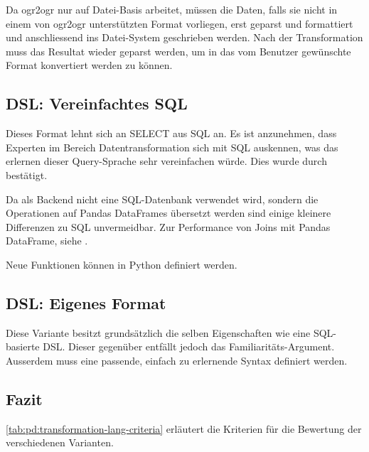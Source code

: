 Da ogr2ogr nur auf Datei-Basis arbeitet, müssen die Daten, falls sie nicht in einem von ogr2ogr unterstützten Format vorliegen, erst geparst und formattiert und anschliessend ins Datei-System geschrieben werden. Nach der Transformation muss das Resultat wieder geparst werden, um in das vom Benutzer gewünschte Format konvertiert werden zu können. 

\subsection{DSL: Vereinfachtes SQL}
Dieses Format lehnt sich an SELECT aus SQL an. Es ist anzunehmen, dass Experten im Bereich Datentransformation sich mit SQL auskennen, was das erlernen dieser Query-Sprache sehr vereinfachen würde. Dies wurde durch \prof bestätigt.

Da als Backend nicht eine SQL-Datenbank verwendet wird, sondern die Operationen auf Pandas DataFrames übersetzt werden sind einige kleinere Differenzen zu SQL unvermeidbar. Zur Performance von Joins mit Pandas DataFrame, siehe \cite{pandasMergePerformance}.

Neue Funktionen können in Python definiert werden.

\subsection{DSL: Eigenes Format}
Diese Variante besitzt grundsätzlich die selben Eigenschaften wie eine SQL-basierte DSL. Dieser gegenüber entfällt jedoch das Familiaritäts-Argument. Ausserdem muss eine passende, einfach zu erlernende Syntax definiert werden.

\subsection{Fazit}
\cref{tab:pd:transformation-lang-criteria} erläutert die Kriterien für die Bewertung der verschiedenen Varianten.

